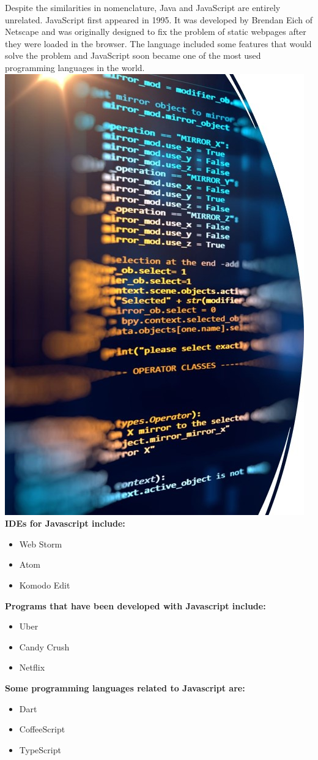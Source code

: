 \documentclass{article}
\begin{document}
Despite the similarities in nomenclature, Java and JavaScript are entirely unrelated. JavaScript first appeared in 1995. It was developed by Brendan Eich of Netscape and was originally designed to fix the problem of static webpages after they were loaded in the browser. The language included some features that would solve the problem and JavaScript soon became one of the most used programming languages in the world.
\\
\includegraphics[width=0.5\linewidth]{picture700}\\
\textbf{IDEs for Javascript include:}\\
\begin{itemize}
	\item Web Storm
	\item Atom
	\item Komodo Edit
\end{itemize}
\textbf{Programs that have been developed with Javascript include:}\\
\begin{itemize}
	\item Uber
	\item Candy Crush
	\item Netflix
\end{itemize}
\textbf{Some programming languages related to Javascript are:}\\
\begin{itemize}
	\item Dart
	\item CoffeeScript
	\item TypeScript
\end{itemize}
	


	
	


	

	
	
	
	
	



	
		
		
	
	
	
	
\end{document}
